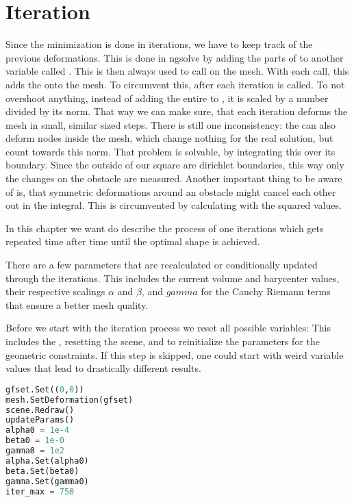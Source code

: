 \section{Iteration}

Since the minimization is done in iterations, we have to keep track of the previous 
deformations. This is done in ngsolve by adding the parts of  to another 
variable called . This  is then always used to call 
 on the mesh. With each call, this adds the  onto the mesh. To circumvent this, 
 after each iteration  is called. To not overshoot anything, 
 instead of adding the entire  to , it is scaled by a number divided 
 by its norm. That way we can make sure, that each iteration deforms the mesh in small, 
 similar sized steps. There is still one inconsistency: the  can also deform 
 nodes inside the mesh, which change nothing for the real solution, but count towards this 
 norm. That problem is solvable, by integrating this  over its boundary. 
 Since the outside of our square are dirichlet boundaries, this way only the changes on the 
 obstacle are measured. Another important thing to be aware of is, that symmetric deformations
  around an obstacle might cancel each other out in the integral. This is circumvented by 
  calculating with the squared values.

In this chapter we want do describe the process of one iterations which gets repeated time after time until the optimal shape is achieved.

There are a few parameters that are recalculated or conditionally updated through the iterations. This includes the current volume and barycenter values, their respective scalings $\alpha$ and $\beta$, and $gamma$ for the Cauchy Riemann terms that ensure a better mesh quality.

Before we start with the iteration process we reset all possible variables:
This includes the , resetting the scene, and to reinitialize the parameters for the geometric constraints. If this step is skipped, one could start with weird variable values that lead to drastically different results.

\begin{lstlisting}[language=Python, title=Reset before iteration, label=lst:reset]
gfset.Set((0,0))
mesh.SetDeformation(gfset)
scene.Redraw()
updateParams()
alpha0 = 1e-4
beta0 = 1e-0
gamma0 = 1e2
alpha.Set(alpha0)
beta.Set(beta0)
gamma.Set(gamma0)
iter_max = 750
\end{lstlisting}

